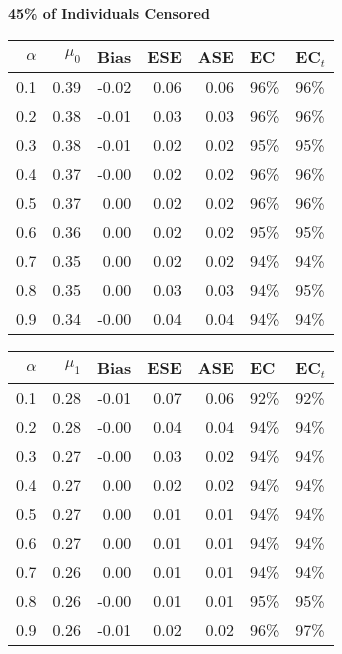 \documentclass[12pt, letterpaper]{article}
\begin{document}
\clearpage


\begin{center}
	\textbf{45\% of Individuals Censored} 
\end{center}
\begin{table}[ht!]
	\centering
	\bgroup
	\def\arraystretch{1.25}
	\setlength\tabcolsep{0.05in}
	\begin{tabular}{rrrrrll}
		\hline
		$\alpha$ & $\mu_0$ & Bias & ESE & ASE & EC & EC$_t$ \\ \hline
		0.1 & 0.39 & -0.02 & 0.06 & 0.06 & 96\% & 96\% \\ 
		0.2 & 0.38 & -0.01 & 0.03 & 0.03 & 96\% & 96\% \\ 
		0.3 & 0.38 & -0.01 & 0.02 & 0.02 & 95\% & 95\% \\ 
		0.4 & 0.37 & -0.00 & 0.02 & 0.02 & 96\% & 96\% \\ 
		0.5 & 0.37 & 0.00 & 0.02 & 0.02 & 96\% & 96\% \\ 
		0.6 & 0.36 & 0.00 & 0.02 & 0.02 & 95\% & 95\% \\ 
		0.7 & 0.35 & 0.00 & 0.02 & 0.02 & 94\% & 94\% \\ 
		0.8 & 0.35 & 0.00 & 0.03 & 0.03 & 94\% & 95\% \\ 
		0.9 & 0.34 & -0.00 & 0.04 & 0.04 & 94\% & 94\% \\ 
		\hline
	\end{tabular}
	\egroup
	\quad 
	\bgroup
	\setlength\tabcolsep{0.05in}
	\def\arraystretch{1.25}
	\begin{tabular}{rrrrrll}
		\hline
		$\alpha$ & $\mu_1$ & Bias & ESE & ASE & EC & EC$_t$ \\ \hline
		0.1 & 0.28 & -0.01 & 0.07 & 0.06 & 92\% & 92\% \\ 
		0.2 & 0.28 & -0.00 & 0.04 & 0.04 & 94\% & 94\% \\ 
		0.3 & 0.27 & -0.00 & 0.03 & 0.02 & 94\% & 94\% \\ 
		0.4 & 0.27 & 0.00 & 0.02 & 0.02 & 94\% & 94\% \\ 
		0.5 & 0.27 & 0.00 & 0.01 & 0.01 & 94\% & 94\% \\ 
		0.6 & 0.27 & 0.00 & 0.01 & 0.01 & 94\% & 94\% \\ 
		0.7 & 0.26 & 0.00 & 0.01 & 0.01 & 94\% & 94\% \\ 
		0.8 & 0.26 & -0.00 & 0.01 & 0.01 & 95\% & 95\% \\ 
		0.9 & 0.26 & -0.01 & 0.02 & 0.02 & 96\% & 97\% \\ 
		\hline
	\end{tabular}

\end{table}
\end{document}
